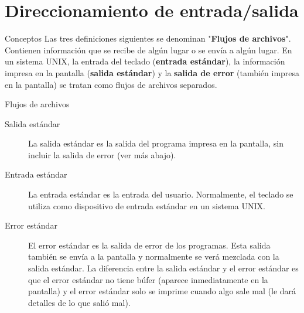 \section{Direccionamiento de entrada/salida}

\begin{frame}[c]{Conceptos}
  Las tres definiciones siguientes se denominan "\textbf{Flujos de archivos}".
  Contienen información que se recibe de algún lugar o se envía a algún lugar.
  En un sistema UNIX, la entrada del teclado (\textbf{entrada estándar}),
  la información impresa en la pantalla (\textbf{salida estándar}) y la
  \textbf{salida de error} (también impresa en la pantalla) se tratan como
  flujos de archivos separados.
\end{frame}

\begin{frame}[c]{Flujos de archivos}
  \begin{description}
    \item[Salida estándar]
      La salida estándar es la salida del programa impresa en la pantalla,
      sin incluir la salida de error (ver más abajo).
    \pausa
    \vspace{\baselineskip}
    \item[Entrada estándar]
      La entrada estándar es la entrada del usuario. Normalmente, el teclado
      se utiliza como dispositivo de entrada estándar en un sistema UNIX.
    \pausa
    \vspace{\baselineskip}
    \item[Error estándar]
      El error estándar es la salida de error de los programas. Esta salida
      también se envía a la pantalla y normalmente se verá mezclada con la
      salida estándar. La diferencia entre la salida estándar y el error
      estándar es que el error estándar no tiene búfer (aparece
      inmediatamente en la pantalla) y el error estándar solo se imprime
      cuando algo sale mal (le dará detalles de lo que salió mal).
  \end{description}
\end{frame}

